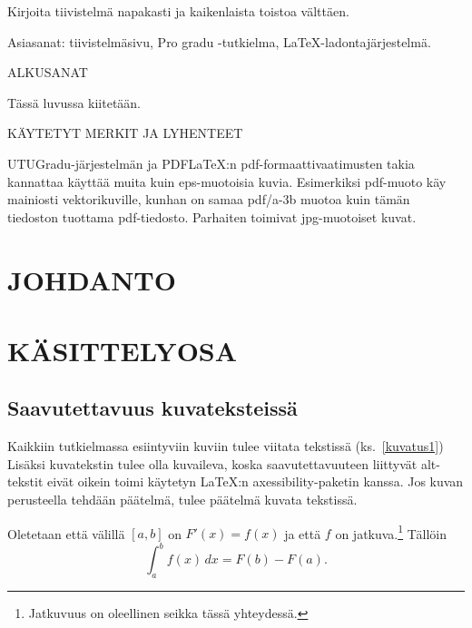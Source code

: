 \vspace{7mm}\noindent Kirjoita tiivistelmä napakasti ja kaikenlaista toistoa välttäen.

\vspace{7mm}\noindent Asiasanat: tiivistelmäsivu, Pro gradu -tutkielma, \LaTeX-ladontajärjestelmä.


\newpage\null
\tableofcontents



\newpage\null
\pagestyle{plain} 
ALKUSANAT
\vspace{1.2cm}

Tässä luvussa kiitetään.

\newpage\null
\pagestyle{plain} 
KÄYTETYT MERKIT JA LYHENTEET

\vspace{1.2cm}
\noindent UTUGradu-järjestelmän ja PDF\LaTeX :n pdf-formaattivaatimusten takia kannattaa käyttää muita kuin eps-muotoisia kuvia. Esimerkiksi pdf-muoto käy mainiosti vektorikuville, kunhan on samaa pdf/a-3b muotoa kuin tämän tiedoston tuottama pdf-tiedosto. Parhaiten toimivat jpg-muotoiset kuvat.


\newpage\null
\pagestyle{plain} 

\section{JOHDANTO}

\lipsum[1]
\vspace{0.7cm}
\lipsum[1]


\section{KÄSITTELYOSA}

\subsection{Saavutettavuus kuvateksteissä}

Kaikkiin tutkielmassa esiintyviin kuviin tulee viitata tekstissä (ks.~\ref{kuvatus1}) Lisäksi kuvatekstin tulee olla kuvaileva, koska saavutettavuuteen liittyvät alt-tekstit eivät oikein toimi käytetyn \LaTeX :n axessibility-paketin kanssa. Jos kuvan perusteella tehdään päätelmä, tulee päätelmä kuvata tekstissä. 
\begin{theorem} Oletetaan että välillä $[a,b]$ on $F'(x)=f(x)$ ja että $f$ on jatkuva.\footnote{Jatkuvuus on oleellinen seikka tässä yhteydessä.} Tällöin
\[
\int_a^bf(x)\,dx=F(b)-F(a).
\]
\end{theorem}


